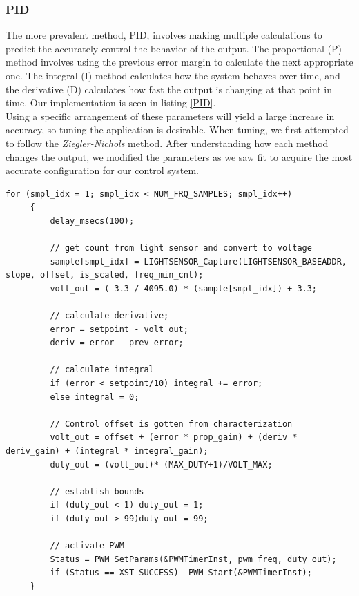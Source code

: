 \documentclass[11pt]{article}
\begin{document}
\subsubsection{PID}
The more prevalent method, PID, involves making multiple calculations to predict the accurately control the behavior of the output.  The proportional (P) method involves using the previous error margin to calculate the next appropriate one.  The integral (I) method calculates how the system behaves over time, and the derivative (D) calculates how fast the output is changing at that point in time.  Our implementation is seen in listing \ref{PID}. \\
Using a specific arrangement of these parameters will yield a large increase in accuracy, so tuning the application is desirable.  When tuning, we first attempted to follow the \emph{Ziegler-Nichols} method.  After understanding how each method changes the output, we modified the parameters as we saw fit to acquire the most accurate configuration for our control system. 

\vspace{12pt}

 \begin{lstlisting}[caption=PID Algorithm, label=PID]		
     for (smpl_idx = 1; smpl_idx < NUM_FRQ_SAMPLES; smpl_idx++)
     {
         delay_msecs(100);
 
         // get count from light sensor and convert to voltage 
         sample[smpl_idx] = LIGHTSENSOR_Capture(LIGHTSENSOR_BASEADDR, slope, offset, is_scaled, freq_min_cnt);
         volt_out = (-3.3 / 4095.0) * (sample[smpl_idx]) + 3.3;

         // calculate derivative;
         error = setpoint - volt_out;
         deriv = error - prev_error;
 
         // calculate integral
         if (error < setpoint/10) integral += error;
         else integral = 0; 
 
         // Control offset is gotten from characterization
         volt_out = offset + (error * prop_gain) + (deriv * deriv_gain) + (integral * integral_gain);
         duty_out = (volt_out)* (MAX_DUTY+1)/VOLT_MAX;
 
         // establish bounds
         if (duty_out < 1) duty_out = 1;
         if (duty_out > 99)duty_out = 99;
 
         // activate PWM
         Status = PWM_SetParams(&PWMTimerInst, pwm_freq, duty_out);
         if (Status == XST_SUCCESS)	 PWM_Start(&PWMTimerInst);
     } 
  \end{lstlisting}
  
\end{document}
